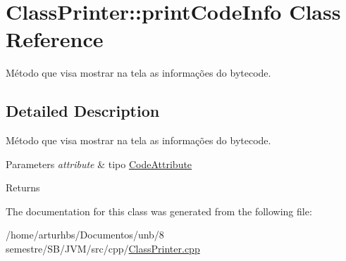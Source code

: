 \hypertarget{classClassPrinter_1_1printCodeInfo}{}\section{Class\+Printer\+:\+:print\+Code\+Info Class Reference}
\label{classClassPrinter_1_1printCodeInfo}


Método que visa mostrar na tela as informações do bytecode.  




\subsection{Detailed Description}
Método que visa mostrar na tela as informações do bytecode. 


\begin{DoxyParams}{Parameters}
{\em attribute} & tipo \hyperlink{classCodeAttribute}{Code\+Attribute} \\
\hline
\end{DoxyParams}
\begin{DoxyReturn}{Returns}

\end{DoxyReturn}


The documentation for this class was generated from the following file\+:\begin{DoxyCompactItemize}
\item 
/home/arturhbs/\+Documentos/unb/8 semestre/\+S\+B/\+J\+V\+M/src/cpp/\hyperlink{ClassPrinter_8cpp}{Class\+Printer.\+cpp}\end{DoxyCompactItemize}
